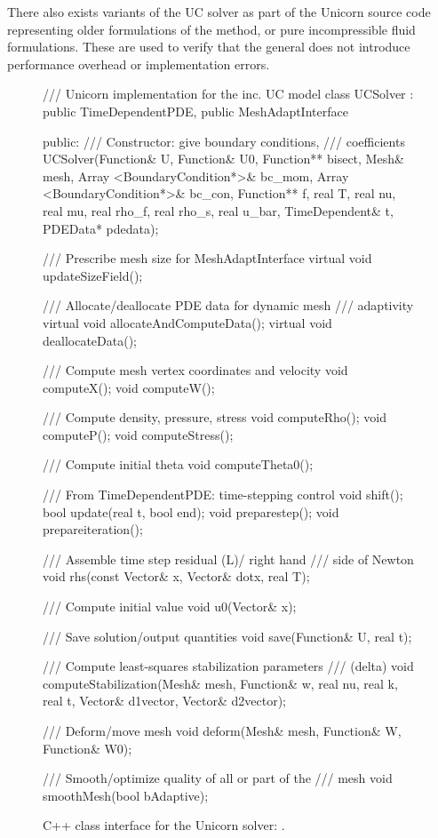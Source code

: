 There also exists variants of the UC solver as part of the Unicorn
source code representing older formulations of the method, or pure
incompressible fluid formulations. These are used to verify that the
general  does not introduce performance overhead or
implementation errors.

\begin{figure}
\begin{c++}
/// Unicorn implementation for the inc. UC model
class UCSolver :
  public TimeDependentPDE, public MeshAdaptInterface
{
public:
  /// Constructor: give boundary conditions,
  /// coefficients
  UCSolver(Function& U, Function& U0,
           Function** bisect, Mesh& mesh,
           Array <BoundaryCondition*>& bc_mom,
           Array <BoundaryCondition*>& bc_con,
           Function** f, real T, real nu,
           real mu, real rho_f, real rho_s,
           real u_bar, TimeDependent& t,
           PDEData* pdedata);

  /// Prescribe mesh size for MeshAdaptInterface
  virtual void updateSizeField();

  /// Allocate/deallocate PDE data for dynamic mesh
  /// adaptivity
  virtual void allocateAndComputeData();
  virtual void deallocateData();

  /// Compute mesh vertex coordinates and velocity
  void computeX();
  void computeW();

  /// Compute density, pressure, stress
  void computeRho();
  void computeP();
  void computeStress();

  /// Compute initial theta
  void computeTheta0();

  /// From TimeDependentPDE: time-stepping control
  void shift();
  bool update(real t, bool end);
  void preparestep();
  void prepareiteration();

  /// Assemble time step residual (L)/ right hand
  /// side of Newton
  void rhs(const Vector& x, Vector& dotx, real T);

  /// Compute initial value
  void u0(Vector& x);

  /// Save solution/output quantities
  void save(Function& U, real t);

  /// Compute least-squares stabilization parameters
  /// (delta)
  void computeStabilization(Mesh& mesh, Function& w,
                            real nu, real k, real t,
                            Vector& d1vector,
                            Vector& d2vector);

  /// Deform/move mesh
  void deform(Mesh& mesh, Function& W, Function& W0);

  /// Smooth/optimize quality of all or part of the
  /// mesh
  void smoothMesh(bool bAdaptive);
}
\end{c++}
\caption{C++ class interface for the Unicorn solver: .}
\label{code:UCSolver}
\end{figure}

